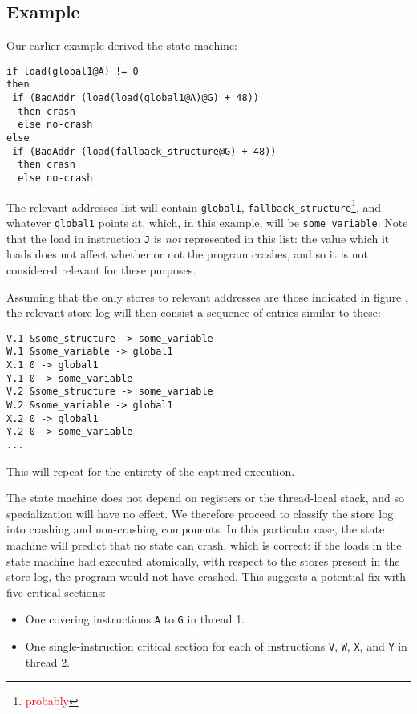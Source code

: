 \documentclass[10pt,twocolumn,preprint,natbib,authoryear]{sigplanconf}
\newcommand{\editorial}[1]{\textcolor{red}{\footnote{\textcolor{red}{#1}}}}
\begin{document}
\subsection{Example}

Our earlier example derived the state machine:

\begin{verbatim}
if load(global1@A) != 0
then
 if (BadAddr (load(load(global1@A)@G) + 48))
  then crash
  else no-crash
else
 if (BadAddr (load(fallback_structure@G) + 48))
  then crash
  else no-crash
\end{verbatim}

The relevant addresses list will contain \verb|global1|,
\verb|fallback_structure|\editorial{probably}, and whatever
\verb|global1| points at, which, in this example, will be
\verb|some_variable|.  Note that the load in instruction \verb|J| is
\emph{not} represented in this list: the value which it loads does not
affect whether or not the program crashes, and so it is not considered
relevant for these purposes.

Assuming that the only stores to relevant addresses are those
indicated in figure \label{fig:broken_privatize}, the relevant store
log will then consist a sequence of entries similar to these:

\begin{verbatim}
V.1 &some_structure -> some_variable
W.1 &some_variable -> global1
X.1 0 -> global1
Y.1 0 -> some_variable
V.2 &some_structure -> some_variable
W.2 &some_variable -> global1
X.2 0 -> global1
Y.2 0 -> some_variable
...
\end{verbatim}

This will repeat for the entirety of the captured execution.

The state machine does not depend on registers or the thread-local
stack, and so specialization will have no effect.  We therefore
proceed to classify the store log into crashing and non-crashing
components.  In this particular case, the state machine will predict
that no state can crash, which is correct: if the loads in the state
machine had executed atomically, with respect to the stores present in
the store log, the program would not have crashed.  This suggests a
potential fix with five critical sections:

\begin{itemize}
\item One covering instructions \verb|A| to \verb|G| in thread 1.
\item One single-instruction critical section for each of instructions
  \verb|V|, \verb|W|, \verb|X|, and \verb|Y| in thread 2.
\end{itemize}
\end{document}
